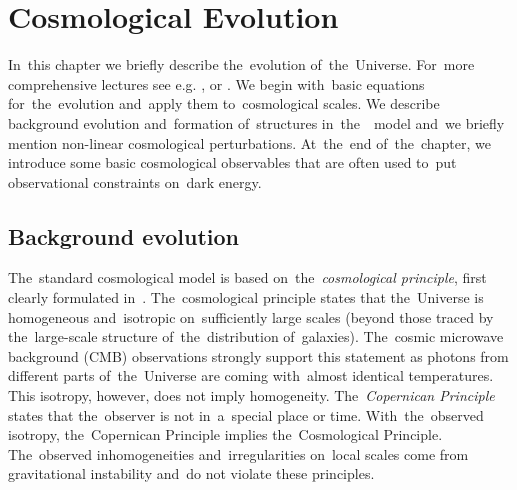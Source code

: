 \chapter{Cosmological Evolution}
\label{chpt:cosmo_evol}
In~this chapter we briefly describe the~evolution of~the~Universe. For~more comprehensive lectures see e.g. \textcite{Ref:Weinberg}, \textcite{2002col.luc..cosmology} or \textcite{2010deto.book.....A}. We begin with~basic equations for~the~evolution and~apply them to~cosmological scales. We describe background evolution and~formation of~structures in~the~\LCDM\ model and~we briefly mention non-linear cosmological perturbations. At~the~end of~the~chapter, we introduce some basic cosmological observables that are often used to~put observational constraints on~dark energy.

\section{Background evolution}
The~standard cosmological model is based on~the~\textit{cosmological principle}, first clearly formulated in~\textcite{1687pnpm.book.....N}. The~cosmological principle states that the~Universe is homogeneous and~isotropic on~sufficiently large scales (beyond those traced by the~large-scale structure of~the~distribution of~galaxies). The~cosmic microwave background (CMB) observations strongly support this statement as photons from different parts of~the~Universe are coming with~almost identical temperatures. This isotropy, however, does not imply homogeneity. The~\textit{Copernican Principle} states that the~observer is not in~a~special place or time. With~the~observed isotropy, the~Copernican Principle implies the~Cosmological Principle. The~observed inhomogeneities and~irregularities on~local scales come from gravitational instability and~do not violate these principles.








